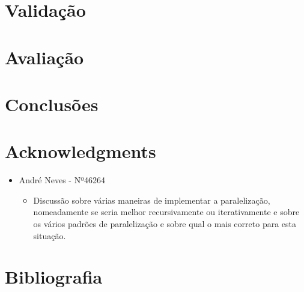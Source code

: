 \documentclass[a4paper]{article}
\begin{document}
\section{Validação}

\section{Avaliação}

\section{Conclusões}

\section{Acknowledgments}
\begin{itemize}
\item André Neves - Nº46264
\begin{itemize}
\item Discussão sobre várias maneiras de implementar a paralelização, nomeadamente se seria melhor recursivamente ou iterativamente e sobre os vários padrões de paralelização e sobre qual o mais correto para esta situação.
\end{itemize}

\end{itemize}



\section{Bibliografia}
\end{document}
